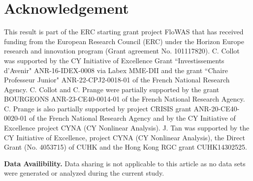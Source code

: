 \documentclass[12pt]{amsart}
\numberwithin{equation}{section}
\numberwithin{equation}{section}
\begin{document}
 
\section*{Acknowledgement}

This result is part of the ERC starting grant project FloWAS that has received funding from the European Research Council (ERC) under the Horizon Europe research and innovation program (Grant agreement No. 101117820). C. Collot was supported by the CY Initiative of Excellence Grant   ``Investissements d'Avenir"   ANR-16-IDEX-0008 via Labex MME-DII and the grant ``Chaire Professeur Junior" ANR-22-CPJ2-0018-01 of the French National Research Agency. C. Collot and C. Prange were partially supported by the grant BOURGEONS ANR-23-CE40-0014-01 of the French National Research Agency.  C. Prange is also partially supported by project CRISIS grant ANR-20-CE40-0020-01 of the French National Research Agency and by the CY Initiative of Excellence project CYNA (CY Nonlinear Analysis). J. Tan was  supported by the CY Initiative of Excellence,  project CYNA (CY Nonlinear Analysis),  the Direct Grant (No.  4053715) of CUHK  and   the Hong Kong RGC grant CUHK14302525.  

\bigbreak

{\bf Data Availibility.}
Data sharing is not applicable to this article as no data sets were generated or analyzed during the current study.

\bigbreak
\end{document}
